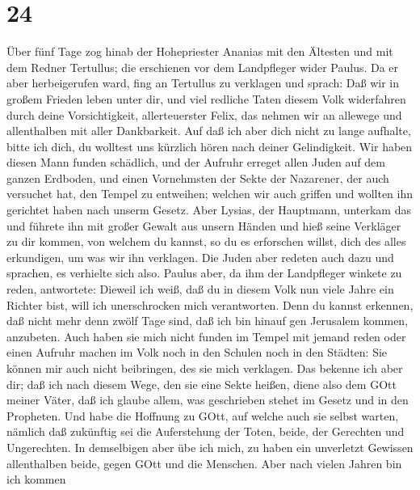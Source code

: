 \hypertarget{section-23}{%
\section{24}\label{section-23}}

 Über fünf Tage zog hinab der Hohepriester Ananias mit den
Ältesten und mit dem Redner Tertullus; die erschienen vor dem
Landpfleger wider Paulus.  Da er aber herbeigerufen ward,
fing an Tertullus zu verklagen und sprach:  Daß wir in
großem Frieden leben unter dir, und viel redliche Taten diesem Volk
widerfahren durch deine Vorsichtigkeit, allerteuerster Felix, das nehmen
wir an allewege und allenthalben mit aller Dankbarkeit.  Auf
daß ich aber dich nicht zu lange aufhalte, bitte ich dich, du wolltest
uns kürzlich hören nach deiner Gelindigkeit.  Wir haben
diesen Mann funden schädlich, und der Aufruhr erreget allen Juden auf
dem ganzen Erdboden, und einen Vornehmsten der Sekte der Nazarener,
 der auch versuchet hat, den Tempel zu entweihen; welchen
wir auch griffen und wollten ihn gerichtet haben nach unserm Gesetz.
 Aber Lysias, der Hauptmann, unterkam das und führete ihn
mit großer Gewalt aus unsern Händen  und hieß seine
Verkläger zu dir kommen, von welchem du kannst, so du es erforschen
willst, dich des alles erkundigen, um was wir ihn verklagen.
 Die Juden aber redeten auch dazu und sprachen, es verhielte
sich also.  Paulus aber, da ihm der Landpfleger winkete zu
reden, antwortete: Dieweil ich weiß, daß du in diesem Volk nun viele
Jahre ein Richter bist, will ich unerschrocken mich verantworten.
 Denn du kannst erkennen, daß nicht mehr denn zwölf Tage
sind, daß ich bin hinauf gen Jerusalem kommen, anzubeten. 
Auch haben sie mich nicht funden im Tempel mit jemand reden oder einen
Aufruhr machen im Volk noch in den Schulen noch in den Städten:
 Sie können mir auch nicht beibringen, des sie mich
verklagen.  Das bekenne ich aber dir; daß ich nach diesem
Wege, den sie eine Sekte heißen, diene also dem GOtt meiner Väter, daß
ich glaube allem, was geschrieben stehet im Gesetz und in den Propheten.
 Und habe die Hoffnung zu GOtt, auf welche auch sie selbst
warten, nämlich daß zukünftig sei die Auferstehung der Toten, beide, der
Gerechten und Ungerechten.  In demselbigen aber übe ich
mich, zu haben ein unverletzt Gewissen allenthalben beide, gegen GOtt
und die Menschen.  Aber nach vielen Jahren bin ich kommen

